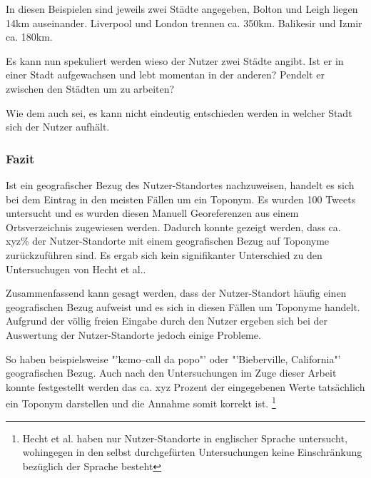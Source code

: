 					In diesen Beispielen sind jeweils zwei Städte angegeben, Bolton und Leigh liegen 14km auseinander.
					Liverpool und London trennen ca. 350km.
					Balikesir und Izmir ca. 180km.

					Es kann nun spekuliert werden wieso der Nutzer zwei Städte angibt.
					Ist er in einer Stadt aufgewachsen und lebt momentan in der anderen?
					Pendelt er zwischen den Städten um zu arbeiten?

					Wie dem auch sei, es kann nicht eindeutig entschieden werden in welcher Stadt sich der Nutzer aufhält.
					

				\subsubsection{Fazit}

					Ist ein geografischer Bezug des Nutzer-Standortes nachzuweisen, handelt es sich bei dem Eintrag in den meisten Fällen um ein Toponym.
					Es wurden 100 Tweets untersucht und es wurden diesen Manuell Georeferenzen aus einem Ortsverzeichnis zugewiesen werden.
					Dadurch konnte gezeigt werden, dass ca. xyz\% der Nutzer-Standorte mit einem geografischen Bezug auf Toponyme zurückzuführen sind.
					Es ergab sich kein signifikanter Unterschied zu den Untersuchugen von Hecht et al..

					Zusammenfassend kann gesagt werden, dass der Nutzer-Standort häufig einen geografischen Bezug aufweist und es sich in diesen Fällen um Toponyme handelt.
					Aufgrund der völlig freien Eingabe durch den Nutzer ergeben sich bei der Auswertung der Nutzer-Standorte jedoch einige Probleme. 



				So haben beispielsweise "'kcmo--call da popo"' oder "'Bieberville, California"' geografischen Bezug.
				Auch nach den Untersuchungen im Zuge dieser Arbeit konnte festgestellt werden das ca. xyz Prozent der eingegebenen Werte tatsächlich ein Toponym darstellen und die Annahme somit korrekt ist. \footnote{
				Hecht et al. haben nur Nutzer-Standorte in englischer Sprache untersucht, wohingegen in den selbst durchgefürten Untersuchungen keine Einschränkung bezüglich der Sprache besteht} 


